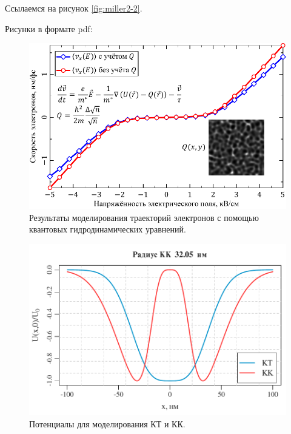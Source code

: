 \documentclass[14pt,oneside]{extarticle}
\begin{document}
Ссылаемся на рисунок \ref{fig:miller2-2}.

Рисунки в формате pdf:

\begin{figure}
    \begin{center}
        \includegraphics{images/iv-curve.pdf}
        \caption{\label{fig:iv-curve-1}
            Результаты моделирования траекторий электронов с помощью квантовых гидродинамических уравнений.}
    \end{center}
\end{figure}

\begin{figure}
    \begin{center}
        \includegraphics{images/qd_qr_potential.pdf}
        \caption{\label{fig:qr-potential-1}
            Потенциалы для моделирования КТ и КК.}
    \end{center}
\end{figure}
    
\end{document}
